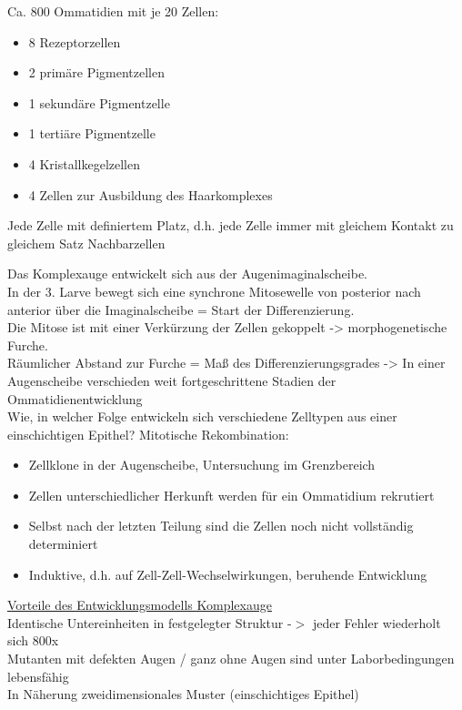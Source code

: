 \documentclass[12pt,a4paper]{article}
\begin{document}
Ca. 800 Ommatidien mit je 20 Zellen:
\begin{itemize}
	\item 8 Rezeptorzellen
	\item 2 primäre Pigmentzellen
	\item 1 sekundäre Pigmentzelle
	\item 1 tertiäre Pigmentzelle
	\item 4 Kristallkegelzellen
	\item 4 Zellen zur Ausbildung des Haarkomplexes
\end{itemize}

Jede Zelle mit definiertem Platz, d.h. jede Zelle immer mit gleichem Kontakt zu gleichem Satz Nachbarzellen

Das Komplexauge entwickelt sich aus der Augenimaginalscheibe.\\
In der 3. Larve bewegt sich eine synchrone Mitosewelle von posterior nach anterior über die Imaginalscheibe = Start der Differenzierung.\\
Die Mitose ist mit einer Verkürzung der Zellen gekoppelt -> morphogenetische Furche.\\
Räumlicher Abstand zur Furche = Maß des Differenzierungsgrades -> In einer Augenscheibe verschieden weit fortgeschrittene Stadien der Ommatidienentwicklung\\

Wie, in welcher Folge entwickeln sich verschiedene Zelltypen aus einer einschichtigen Epithel? Mitotische Rekombination:
\begin{itemize}
	\item Zellklone in der Augenscheibe, Untersuchung im Grenzbereich
	\item Zellen unterschiedlicher Herkunft werden für ein Ommatidium rekrutiert
	\item Selbst nach der letzten Teilung sind die Zellen noch nicht vollständig determiniert
	\item Induktive, d.h. auf Zell-Zell-Wechselwirkungen, beruhende Entwicklung
\end{itemize}

\underline{Vorteile des Entwicklungsmodells Komplexauge}\\
Identische Untereinheiten in festgelegter Struktur -$>$ jeder Fehler wiederholt sich 800x\\
Mutanten mit defekten Augen / ganz ohne Augen sind unter Laborbedingungen lebensfähig\\
In Näherung zweidimensionales Muster (einschichtiges Epithel)\\
\end{document}
